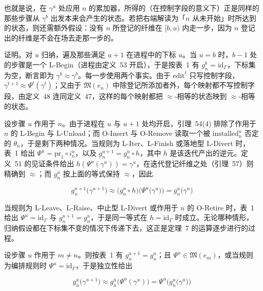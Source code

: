 \documentclass[
  10
]{article}
\begin{document}
也就是说，在 \(\gamma ^ { u }\) 处应用 \(n\) 的累加器，所得的（在控制字段的意义下）正是同样的那些步骤从 \(\gamma ^ { b }\) 出发本来会产生的状态。若把右端解读为「\(n\) 从未开始」时所达到的状态，则还需额外假设：没有 \(n\) 所登记的纤维在 \([ b , u )\) 内走一步，因为 \(n\) 登记出的纤维是不会在场去走那一步的。

证明。对 \(u\) 归纳，遍及那些满足 \(u+1\) 在进程中的下标 \(u\)。当 \(u = b\) 时，\(b - 1\) 处的步骤是一个 L-Begin（进程由定义~53 开启），于是按表~1 有 \(g _ { n } ^ { b } = \mathrm { i d } _ { \Gamma }\)，下标集为空，断言即为 \(\gamma ^ { b } \approx \gamma ^ { b }\)。每一步使用两个事实。由于 \(\mathrm { e d i t } ^ { t }\) 只写控制字段，\(\gamma ^ { t + 1 } \approx \Psi ^ { t } ( \gamma ^ { t })\)；又由于 \(\mathfrak { M } ( e _ { n } )\) 中除登记所添加者外，每个映射都不写控制字段，由定义~48 连同定义~47，这样的每个映射都把 $\approx$-相等的状态映到 $\approx$-相等的状态。

设步骤 \(u\) 作用于 \(n\)。由于进程在 \(u\) 与 \(u+1\) 处均开启，引理~54(4) 排除了作用于 \(n\) 的 L-Begin 与 L-Unload；而 O-Insert 与 O-Remove 读取一个被 \(\mathrm { i n s t a l l e d } _ { n } ^ { u }\) 否定的 \(\theta _ { n }\)，于是剩下两种情况。当规则为 L-Iter、L-Finish 或落地型 L-Divert 时，表~1 给出 \(\Psi ^ { u } = \mathrm { p r } _ { 1 } \circ i _ { n } ^ { u }\)，以及 \(g _ { n } ^ { u + 1 } = g _ { n } ^ { u } \circ h\)，其中 \(h\) 是该迭代产出的逆元。定义~51 的见证条件给出 \(h ( \Psi ^ { u } ( \gamma ^ { u } ) ) = \gamma ^ { u }\)，在迭代登记纤维之处（引理~57）则精确到 $\approx$；而 \(g _ { n } ^ { u }\) 按上面的等式保持 $\approx$，因此

\[
g _ { n } ^ { u + 1 } \big ( \gamma ^ { u + 1 } \big ) \approx \big ( g _ { n } ^ { u } \circ h \big ) \big ( \Psi ^ { u } \big ( \gamma ^ { u } \big ) \big ) = g _ { n } ^ { u } \big ( \gamma ^ { u } \big )
\]

当规则为 L-Leave、L-Raise、中止型 L-Divert 或作用于 \(n\) 的 O-Retire 时，表~1 给出 \(\Psi ^ { u } = \mathrm { i d } _ { \Gamma }\) 与 \(g _ { n } ^ { u + 1 } = g _ { n } ^ { u }\)，于是同一等式在 \(h = \mathrm { i d } _ { \Gamma }\) 时成立。无论哪种情形，归纳假设都在下标集不变的情况下传递下去，这正是定理~7 的运算逐步进行的过程。

设步骤 \(u\) 作用于 \(m \neq n\)。则按表~1 有 \(g _ { n } ^ { u + 1 } = g _ { n } ^ { u }\)；且 \(\Psi ^ { u } \in \mathfrak { M } ( e _ { m } )\)，或当规则为编排规则时 \(\Psi ^ { u } = \mathrm { i d } _ { \Gamma }\)，于是独立性给出

\[
g _ { n } ^ { u } \bigl ( \gamma ^ { u + 1 } \bigr ) \approx g _ { n } ^ { u } \bigl ( \Psi ^ { u } ( \gamma ^ { u } ) \bigr ) = \Psi ^ { u } \bigl ( g _ { n } ^ { u } \bigl ( \gamma ^ { u } \bigr ) \bigr )
\]
\end{document}
